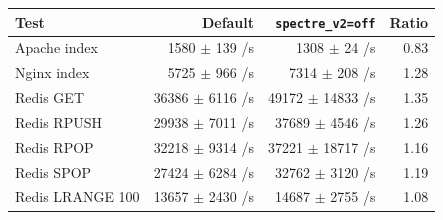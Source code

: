 \begin{tabular}{@{}lrrr@{}}
\toprule
Test & Default & \texttt{spectre\_v2=off} & Ratio \\
\midrule
Apache index & 1580 $\pm$ 139 /s & 1308 $\pm$ 24 /s & 0.83 \\
Nginx index & 5725 $\pm$ 966 /s & 7314 $\pm$ 208 /s & 1.28 \\
Redis GET & 36386 $\pm$ 6116 /s & 49172 $\pm$ 14833 /s & 1.35 \\
Redis RPUSH & 29938 $\pm$ 7011 /s & 37689 $\pm$ 4546 /s & 1.26 \\
Redis RPOP & 32218 $\pm$ 9314 /s & 37221 $\pm$ 18717 /s & 1.16 \\
Redis SPOP & 27424 $\pm$ 6284 /s & 32762 $\pm$ 3120 /s & 1.19 \\
Redis LRANGE 100 & 13657 $\pm$ 2430 /s & 14687 $\pm$ 2755 /s & 1.08 \\
\bottomrule
\end{tabular}
